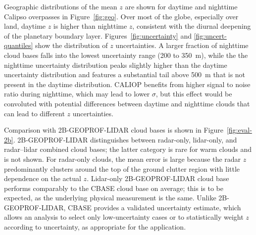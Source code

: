 \documentclass[essd,manuscript]{copernicus}\usepackage[]{graphicx}\usepackage[]{color}
\newcommand\CBH{\ensuremath{z}}
\begin{document}
Geographic distributions of the mean \CBH{} are shown for daytime and nighttime
Calipso overpasses in Figure~\ref{fig:geo}.  Over most of the globe, especially
over land, daytime \CBH{} is higher than nighttime \CBH{}, consistent with the
diurnal deepening of the planetary boundary layer.
Figures~\ref{fig:uncertainty} and \ref{fig:uncert-quantiles} show the
distribution of \CBH{} uncertainties.  A larger fraction of nighttime cloud
bases falls into the lowest uncertainty range (200 to 350~\unit{m}), while the the
nighttime uncertainty distribution peaks slightly higher than the daytime
uncertainty distribution and features a substantial tail above 500~\unit{m} that
is not present in the daytime distribution.  CALIOP benefits from higher signal
to noise ratio during nighttime, which may lead to lower $\sigma$, but this
effect would be convoluted with potential differences between daytime and
nighttime clouds that can lead to different \CBH{}
uncertainties.  

Comparison with 2B-GEOPROF-LIDAR cloud bases is shown in
Figure~\ref{fig:eval-2b}.  2B-GEOPROF-LIDAR distinguishes between radar-only,
lidar-only, and radar--lidar combined cloud bases; the latter category is rare
for warm clouds and is not shown.  For radar-only clouds, the mean error is large
because the radar \CBH{} predominantly clusters around the top of the ground
clutter region with little dependence on the actual \CBH{}.  Lidar-only
2B-GEOPROF-LIDAR cloud base performs comparably to the CBASE cloud base on
average; this is to be expected, as the underlying physical measurement is the
same.  Unlike 2B-GEOPROF-LIDAR, CBASE provides a validated uncertainty estimate,
which allows an analysis to select only low-uncertainty cases or to
statistically weight \CBH{} according to uncertainty, as appropriate for the
application.
\end{document}
